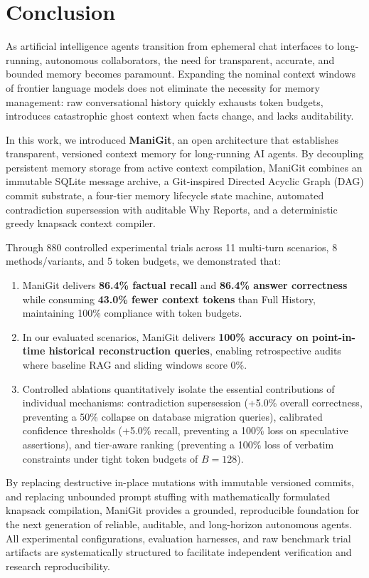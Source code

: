 \section{Conclusion}
\label{sec:conclusion}

As artificial intelligence agents transition from ephemeral chat interfaces to long-running, autonomous collaborators, the need for transparent, accurate, and bounded memory becomes paramount. Expanding the nominal context windows of frontier language models does not eliminate the necessity for memory management: raw conversational history quickly exhausts token budgets, introduces catastrophic ghost context when facts change, and lacks auditability.

In this work, we introduced \textbf{ManiGit}, an open architecture that establishes transparent, versioned context memory for long-running AI agents. By decoupling persistent memory storage from active context compilation, ManiGit combines an immutable SQLite message archive, a Git-inspired Directed Acyclic Graph (DAG) commit substrate, a four-tier memory lifecycle state machine, automated contradiction supersession with auditable Why Reports, and a deterministic greedy knapsack context compiler.

Through 880 controlled experimental trials across 11 multi-turn scenarios, 8 methods/variants, and 5 token budgets, we demonstrated that:
\begin{enumerate}
    \item ManiGit delivers \textbf{86.4\% factual recall} and \textbf{86.4\% answer correctness} while consuming \textbf{43.0\% fewer context tokens} than Full History, maintaining 100\% compliance with token budgets.
    \item In our evaluated scenarios, ManiGit delivers \textbf{100\% accuracy on point-in-time historical reconstruction queries}, enabling retrospective audits where baseline RAG and sliding windows score 0\%.
    \item Controlled ablations quantitatively isolate the essential contributions of individual mechanisms: contradiction supersession (+5.0\% overall correctness, preventing a 50\% collapse on database migration queries), calibrated confidence thresholds (+5.0\% recall, preventing a 100\% loss on speculative assertions), and tier-aware ranking (preventing a 100\% loss of verbatim constraints under tight token budgets of $B=128$).
\end{enumerate}

By replacing destructive in-place mutations with immutable versioned commits, and replacing unbounded prompt stuffing with mathematically formulated knapsack compilation, ManiGit provides a grounded, reproducible foundation for the next generation of reliable, auditable, and long-horizon autonomous agents. All experimental configurations, evaluation harnesses, and raw benchmark trial artifacts are systematically structured to facilitate independent verification and research reproducibility.

